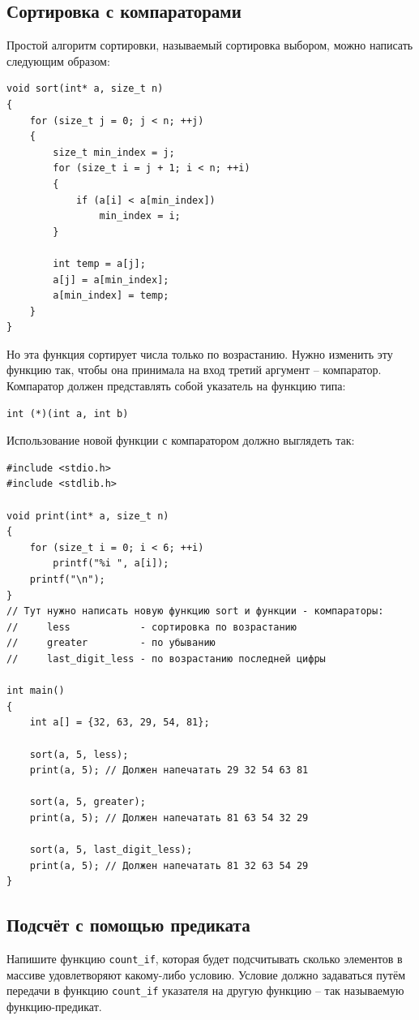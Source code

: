 \documentclass{article}
\begin{document}
\subsection{Сортировка с компараторами}
Простой алгоритм сортировки, называемый сортировка выбором, можно написать следующим образом:
\begin{lstlisting}
void sort(int* a, size_t n)
{
    for (size_t j = 0; j < n; ++j)
    {
        size_t min_index = j;
        for (size_t i = j + 1; i < n; ++i)
        {
            if (a[i] < a[min_index])
                min_index = i;
        }

        int temp = a[j];
        a[j] = a[min_index];
        a[min_index] = temp;
    }
}
\end{lstlisting}
Но эта функция сортирует числа только по возрастанию. Нужно изменить эту функцию так, чтобы она принимала на вход третий аргумент -- компаратор. Компаратор должен представлять собой указатель на функцию типа:
\begin{lstlisting}
int (*)(int a, int b)
\end{lstlisting}
Использование новой функции с компаратором должно выглядеть так:
\begin{lstlisting}
#include <stdio.h>
#include <stdlib.h>

void print(int* a, size_t n)
{
    for (size_t i = 0; i < 6; ++i)
        printf("%i ", a[i]);
    printf("\n");
}
// Тут нужно написать новую функцию sort и функции - компараторы: 
//     less            - сортировка по возрастанию
//     greater         - по убыванию
//     last_digit_less - по возрастанию последней цифры

int main()
{
    int a[] = {32, 63, 29, 54, 81};
    
    sort(a, 5, less);
    print(a, 5); // Должен напечатать 29 32 54 63 81 
        
    sort(a, 5, greater);
    print(a, 5); // Должен напечатать 81 63 54 32 29
    
    sort(a, 5, last_digit_less);
    print(a, 5); // Должен напечатать 81 32 63 54 29
}
\end{lstlisting}


\subsection{Подсчёт с помощью предиката}
Напишите функцию \texttt{count\_if}, которая будет подсчитывать сколько элементов в массиве удовлетворяют какому-либо условию. Условие должно задаваться путём передачи в функцию \texttt{count\_if} указателя на другую функцию -- так называемую функцию-предикат.
\end{document}
